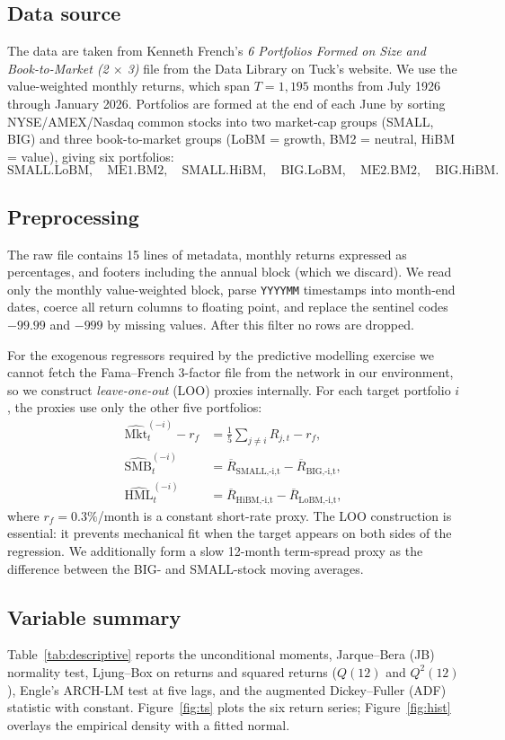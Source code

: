 \documentclass[11pt,a4paper]{article}
\begin{document}
\subsection{Data source}
The data are taken from Kenneth French's \emph{6 Portfolios Formed on Size and Book-to-Market (2 $\times$ 3)} file from the Data Library on Tuck's website. We use the value-weighted monthly returns, which span $T=1{,}195$ months from July 1926 through January 2026. Portfolios are formed at the end of each June by sorting NYSE/AMEX/Nasdaq common stocks into two market-cap groups (SMALL, BIG) and three book-to-market groups (LoBM = growth, BM2 = neutral, HiBM = value), giving six portfolios:
\[
\text{SMALL.LoBM},\quad \text{ME1.BM2},\quad \text{SMALL.HiBM},\quad \text{BIG.LoBM},\quad \text{ME2.BM2},\quad \text{BIG.HiBM}.
\]

\subsection{Preprocessing}
The raw file contains 15 lines of metadata, monthly returns expressed as percentages, and footers including the annual block (which we discard). We read only the monthly value-weighted block, parse \texttt{YYYYMM} timestamps into month-end dates, coerce all return columns to floating point, and replace the sentinel codes $-99.99$ and $-999$ by missing values. After this filter no rows are dropped.

For the exogenous regressors required by the predictive modelling exercise we cannot fetch the Fama--French 3-factor file from the network in our environment, so we construct \emph{leave-one-out} (LOO) proxies internally. For each target portfolio $i$, the proxies use only the other five portfolios:
\begin{align}
\widehat{\text{Mkt}}_t^{(-i)} - r_f &= \tfrac{1}{5}\sum_{j \ne i} R_{j,t} - r_f,\\
\widehat{\text{SMB}}_t^{(-i)} &= \overline{R}_{\text{SMALL,-i,t}} - \overline{R}_{\text{BIG,-i,t}},\\
\widehat{\text{HML}}_t^{(-i)} &= \overline{R}_{\text{HiBM,-i,t}} - \overline{R}_{\text{LoBM,-i,t}},
\end{align}
where $r_f = 0.3\%$/month is a constant short-rate proxy. The LOO construction is essential: it prevents mechanical fit when the target appears on both sides of the regression. We additionally form a slow 12-month term-spread proxy as the difference between the BIG- and SMALL-stock moving averages.

\subsection{Variable summary}
Table~\ref{tab:descriptive} reports the unconditional moments, Jarque--Bera (JB) normality test, Ljung--Box on returns and squared returns ($Q(12)$ and $Q^2(12)$), Engle's ARCH-LM test at five lags, and the augmented Dickey--Fuller (ADF) statistic with constant. Figure~\ref{fig:ts} plots the six return series; Figure~\ref{fig:hist} overlays the empirical density with a fitted normal.
\end{document}

